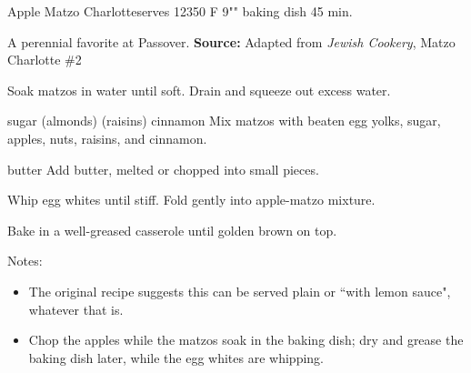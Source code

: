 \begin{recipe}{Apple Matzo Charlotte}{serves 12}{350\0 F \hfill 9"" baking dish \hfill 45 min.}

 \freeform A perennial favorite at Passover.
 \textbf{Source:} Adapted from \textit{Jewish Cookery}, Matzo Charlotte \#2

 Soak matzos in water until soft. Drain and squeeze out excess water.

  {sugar}
  {(almonds)}
  {(raisins)}
  {cinnamon}
 Mix matzos with beaten egg yolks, sugar, apples, nuts, raisins, and cinnamon.

  {butter}
 Add butter, melted or chopped into small pieces.

 Whip egg whites until stiff. Fold gently into apple-matzo mixture.

 \newstep Bake in a well-greased casserole until golden brown on top.

 \freeform Notes:
 \begin{itemize}
  \item The original recipe suggests this can be served plain or ``with lemon sauce", whatever that is.
  \item Chop the apples while the matzos soak in the baking dish; dry and grease the baking dish later, while the egg whites are whipping.
 \end{itemize}
\end{recipe}
